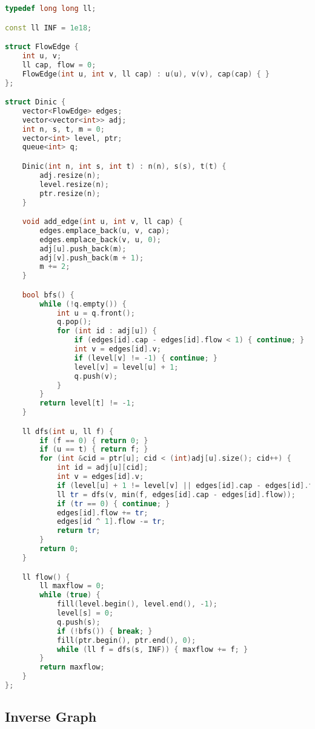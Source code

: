 \documentclass[11pt, a4paper, twoside]{article}
\begin{document}
\begin{lstlisting}[language=C++]
typedef long long ll;

const ll INF = 1e18;

struct FlowEdge {
    int u, v;
    ll cap, flow = 0;
    FlowEdge(int u, int v, ll cap) : u(u), v(v), cap(cap) { }
};

struct Dinic {
    vector<FlowEdge> edges;
    vector<vector<int>> adj;
    int n, s, t, m = 0;
    vector<int> level, ptr;
    queue<int> q;

    Dinic(int n, int s, int t) : n(n), s(s), t(t) {
        adj.resize(n);
        level.resize(n);
        ptr.resize(n);
    }

    void add_edge(int u, int v, ll cap) {
        edges.emplace_back(u, v, cap);
        edges.emplace_back(v, u, 0);
        adj[u].push_back(m);
        adj[v].push_back(m + 1);
        m += 2;
    }

    bool bfs() {
        while (!q.empty()) {
            int u = q.front();
            q.pop();
            for (int id : adj[u]) {
                if (edges[id].cap - edges[id].flow < 1) { continue; }
                int v = edges[id].v;
                if (level[v] != -1) { continue; }
                level[v] = level[u] + 1;
                q.push(v);
            }
        }
        return level[t] != -1;
    }

    ll dfs(int u, ll f) {
        if (f == 0) { return 0; }
        if (u == t) { return f; }
        for (int &cid = ptr[u]; cid < (int)adj[u].size(); cid++) {
            int id = adj[u][cid];
            int v = edges[id].v;
            if (level[u] + 1 != level[v] || edges[id].cap - edges[id].flow < 1) { continue; }
            ll tr = dfs(v, min(f, edges[id].cap - edges[id].flow));
            if (tr == 0) { continue; }
            edges[id].flow += tr;
            edges[id ^ 1].flow -= tr;
            return tr;
        }
        return 0;
    }

    ll flow() {
        ll maxflow = 0;
        while (true) {
            fill(level.begin(), level.end(), -1);
            level[s] = 0;
            q.push(s);
            if (!bfs()) { break; }
            fill(ptr.begin(), ptr.end(), 0);
            while (ll f = dfs(s, INF)) { maxflow += f; }
        }
        return maxflow;
    }
};
\end{lstlisting}

\subsection{Inverse Graph}
\end{document}
